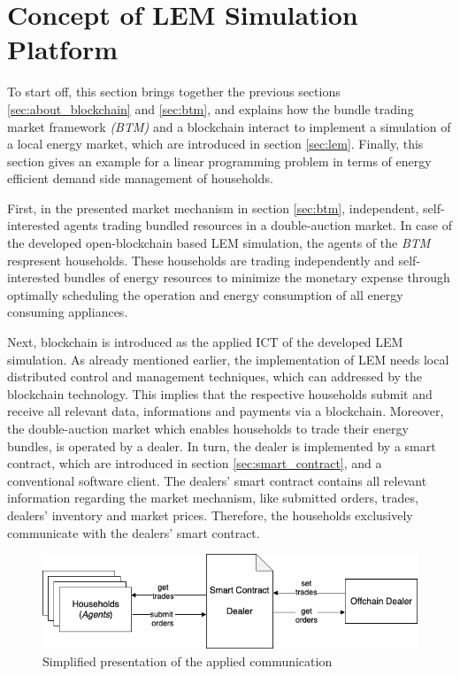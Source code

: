 \section{Concept of LEM Simulation Platform}
\label{sec:concept_of_lem}
To start off, this section brings together the previous sections \ref{sec:about_blockchain} and \ref{sec:btm},
and explains how the bundle trading market framework \textit{(BTM)} and a blockchain interact to implement a simulation 
of a local energy market, which are introduced in section \ref{sec:lem}.
Finally, this section gives an example for a linear programming problem in terms of energy efficient demand side management of households. 

First, in the presented market mechanism in section \ref{sec:btm}, independent, self-interested agents trading bundled resources
in a double-auction market. 
In case of the developed open-blockchain based LEM simulation, the agents of the \textit{BTM} respresent households. 
These households are trading independently and self-interested bundles of energy resources 
to minimize the monetary expense through optimally scheduling the operation and energy consumption 
of all energy consuming appliances.

Next, blockchain is introduced as the applied ICT of the developed LEM simulation. 
As already mentioned earlier, the implementation of LEM needs 
local distributed control and management techniques, which can addressed by the blockchain technology.
This implies that the respective households submit and receive all relevant data, informations and payments via a blockchain. 
Moreover, the double-auction market which enables households to trade their energy bundles, is operated by a dealer.
In turn, the dealer is implemented by a smart contract, which are introduced in section \ref{sec:smart_contract}, and a conventional software client. 
The dealers' smart contract contains all relevant information regarding the market mechanism, like submitted orders, trades, 
dealers' inventory and market prices. 
Therefore, the households exclusively communicate with the dealers' smart contract. 

\begin{figure}[htbp]
	\centering
	\includegraphics[width=.7\linewidth]{./figures/concept_lem.png}
	\caption{Simplified presentation of the applied communication}
	\label{figure:concept_lem}
\end{figure}

